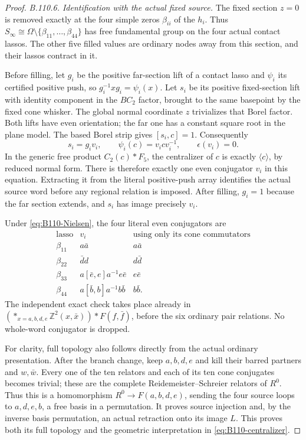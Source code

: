 \begin{proof}
\emph{B.110.6. Identification with the actual fixed source.}
The fixed section $z=0$ is removed exactly at the four simple zeros
$\beta_{ii}$ of the $h_i$. Thus
$S_\infty\cong\Omega\setminus\{\beta_{11},\ldots,\beta_{44}\}$
has free fundamental group on the four actual contact lassos.
The other five filled values are ordinary nodes away from this
section, and their lassos contract in it.

Before filling, let $g_i$ be the positive far-section lift of a
contact lasso and $\psi_i$ its certified positive push, so
$g_i^{-1}xg_i=\psi_i(x)$. Let $s_i$ be its positive fixed-section
lift with identity component in the $BC_2$ factor, brought to the
same basepoint by the fixed cone whisker. The global normal coordinate
$z$ trivializes that Borel factor. Both lifts have even orientation;
the far one has a constant square root in the plane model. The
based Borel strip gives $[s_i,c]=1$. Consequently
\[
 s_i=g_i v_i,\qquad \psi_i(c)=v_i c v_i^{-1},\qquad
 \epsilon(v_i)=0.
\]
In the generic free product $C_2(c)*F_5$, the centralizer of $c$
is exactly $\langle c\rangle$, by reduced normal form. There is
therefore exactly one even conjugator $v_i$ in this equation.
Extracting it from the literal positive-push array identifies the
actual source word before any regional relation is imposed.
After filling, $g_i=1$ because the far section extends, and $s_i$
has image precisely $v_i$.

Under \eqref{eq:B110-Nielsen}, the four literal even conjugators are
\[
 \begin{array}{c|c|c}
 \text{lasso}&v_i&\text{using only its cone commutators}\\\hline
 \beta_{11}&a\bar a&a\bar a\\
 \beta_{22}&\bar d d&d\bar d\\
 \beta_{33}&a[\bar e,e]a^{-1}e\bar e&e\bar e\\
 \beta_{44}&a[\bar b,b]a^{-1}b\bar b&b\bar b.
 \end{array}
\]
The independent exact check takes place already in
$(*_{x=a,b,d,e}\mathbb Z^2(x,\bar x))*F(f,\bar f)$, before the
six ordinary pair relations. No whole-word conjugator is dropped.

For clarity, full topology also follows directly from the actual
ordinary presentation. After the branch change, keep $a,b,d,e$
and kill their barred partners and $w,\bar w$. Every one of the
ten relators and each of its ten cone conjugates becomes trivial;
these are the complete Reidemeister--Schreier relators of $R^0$.
Thus this is a homomorphism $R^0\to F(a,b,d,e)$, sending the four
source loops to $a,d,e,b$, a free basis in a permutation. It proves
source injection and, by the inverse basis permutation, an actual
retraction onto its image $L$. This proves both its full topology
and the geometric interpretation in \eqref{eq:B110-centralizer}.


\end{proof}
